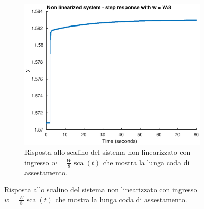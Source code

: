 \documentclass[a4paper]{article}
\DeclareMathOperator*{\sca}{\textrm{sca}}
\begin{document}
\begin{figure}[h!]
\begin{subfigure}[t]{0.3\textwidth}
    \label{fig:step_sim_nonlin}
\end{subfigure}
~
\begin{subfigure}[t]{0.3\textwidth}
    \centering
    \includegraphics[width=\textwidth]{step_nonlin_long}
    \caption{Risposta allo scalino del sistema non linearizzato con ingresso $w = \frac{W}{8} \sca (t)$ che mostra la lunga coda di assestamento.}
    \label{fig:step_sim_nonlin_long}
\end{subfigure}
\end{figure}
\end{document}
